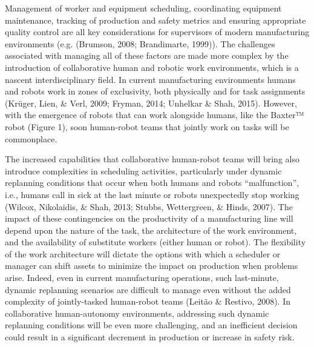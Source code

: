 Management of worker and equipment scheduling, coordinating equipment maintenance, tracking of production and safety metrics and ensuring appropriate quality control are all key considerations for supervisors of modern manufacturing environments (e.g. (Brumson, 2008; Brandimarte, 1999)). The challenges associated with managing all of these factors are made more complex by the introduction of collaborative human and robotic work environments, which is a nascent interdisciplinary field. In current manufacturing environments humans and robots work in zones of exclusivity, both physically and for task assignments (Krüger, Lien, \& Verl, 2009; Fryman, 2014; Unhelkar \& Shah, 2015). However, with the emergence of robots that can work alongside humans, like the Baxter™ robot (Figure 1), soon human-robot teams  that jointly work on tasks will be commonplace. 


The increased capabilities that collaborative human-robot teams will bring also introduce complexities in scheduling activities, particularly under dynamic replanning conditions  that occur when both humans and robots “malfunction”, i.e., humans call in sick at the last minute or robots unexpectedly stop working (Wilcox, Nikolaidis, \& Shah, 2013; Stubbs, Wettergreen, \& Hinds, 2007). The impact of these contingencies on the productivity of a manufacturing line will depend upon the nature of the task, the architecture of the work environment, and the availability of substitute workers (either human or robot). The flexibility of the work architecture will dictate the options with which a scheduler or manager can shift assets to minimize the impact on production when problems arise. Indeed, even in current manufacturing operations, such last-minute, dynamic replanning scenarios are difficult to manage even without the added complexity of jointly-tasked human-robot teams (Leitão \& Restivo, 2008). In collaborative human-autonomy environments, addressing such dynamic replanning conditions will be even more challenging, and an inefficient decision could result in a significant decrement in production or increase in safety risk.

